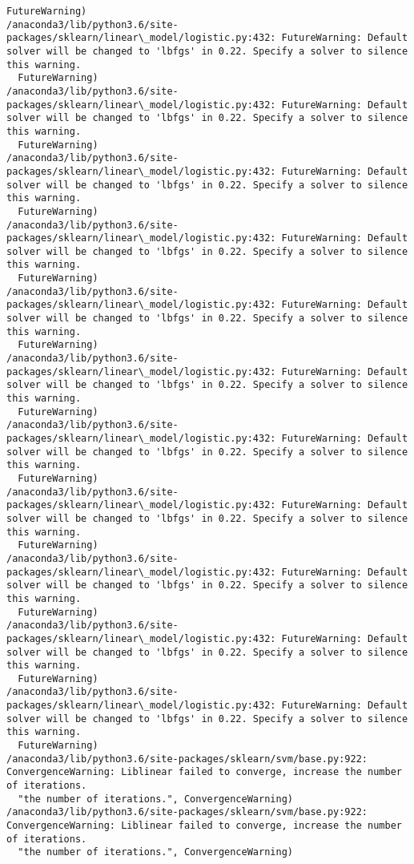 \documentclass[11pt]{article}
\begin{document}
\begin{Verbatim}[commandchars=\\\{\}]
  FutureWarning)
/anaconda3/lib/python3.6/site-packages/sklearn/linear\_model/logistic.py:432: FutureWarning: Default solver will be changed to 'lbfgs' in 0.22. Specify a solver to silence this warning.
  FutureWarning)
/anaconda3/lib/python3.6/site-packages/sklearn/linear\_model/logistic.py:432: FutureWarning: Default solver will be changed to 'lbfgs' in 0.22. Specify a solver to silence this warning.
  FutureWarning)
/anaconda3/lib/python3.6/site-packages/sklearn/linear\_model/logistic.py:432: FutureWarning: Default solver will be changed to 'lbfgs' in 0.22. Specify a solver to silence this warning.
  FutureWarning)
/anaconda3/lib/python3.6/site-packages/sklearn/linear\_model/logistic.py:432: FutureWarning: Default solver will be changed to 'lbfgs' in 0.22. Specify a solver to silence this warning.
  FutureWarning)
/anaconda3/lib/python3.6/site-packages/sklearn/linear\_model/logistic.py:432: FutureWarning: Default solver will be changed to 'lbfgs' in 0.22. Specify a solver to silence this warning.
  FutureWarning)
/anaconda3/lib/python3.6/site-packages/sklearn/linear\_model/logistic.py:432: FutureWarning: Default solver will be changed to 'lbfgs' in 0.22. Specify a solver to silence this warning.
  FutureWarning)
/anaconda3/lib/python3.6/site-packages/sklearn/linear\_model/logistic.py:432: FutureWarning: Default solver will be changed to 'lbfgs' in 0.22. Specify a solver to silence this warning.
  FutureWarning)
/anaconda3/lib/python3.6/site-packages/sklearn/linear\_model/logistic.py:432: FutureWarning: Default solver will be changed to 'lbfgs' in 0.22. Specify a solver to silence this warning.
  FutureWarning)
/anaconda3/lib/python3.6/site-packages/sklearn/linear\_model/logistic.py:432: FutureWarning: Default solver will be changed to 'lbfgs' in 0.22. Specify a solver to silence this warning.
  FutureWarning)
/anaconda3/lib/python3.6/site-packages/sklearn/linear\_model/logistic.py:432: FutureWarning: Default solver will be changed to 'lbfgs' in 0.22. Specify a solver to silence this warning.
  FutureWarning)
/anaconda3/lib/python3.6/site-packages/sklearn/linear\_model/logistic.py:432: FutureWarning: Default solver will be changed to 'lbfgs' in 0.22. Specify a solver to silence this warning.
  FutureWarning)
/anaconda3/lib/python3.6/site-packages/sklearn/svm/base.py:922: ConvergenceWarning: Liblinear failed to converge, increase the number of iterations.
  "the number of iterations.", ConvergenceWarning)
/anaconda3/lib/python3.6/site-packages/sklearn/svm/base.py:922: ConvergenceWarning: Liblinear failed to converge, increase the number of iterations.
  "the number of iterations.", ConvergenceWarning)

\end{Verbatim}
\end{document}
